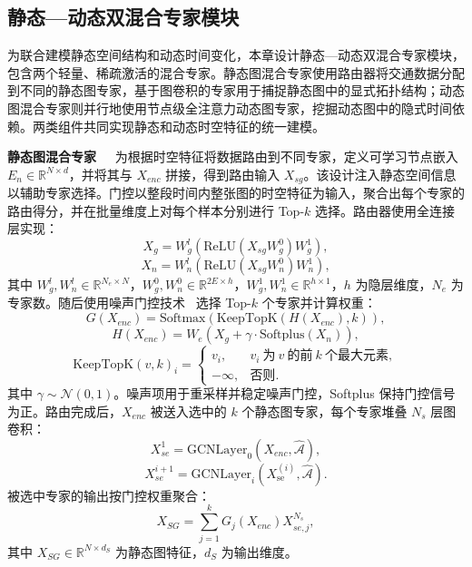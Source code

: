 \subsection{静态—动态双混合专家模块}
\label{sec:ch4_sdmoe}

为联合建模静态空间结构和动态时间变化，本章设计静态—动态双混合专家模块，包含两个轻量、稀疏激活的混合专家。静态图混合专家使用路由器将交通数据分配到不同的静态图专家，基于图卷积的专家用于捕捉静态图中的显式拓扑结构；动态图混合专家则并行地使用节点级全注意力动态图专家，挖掘动态图中的隐式时间依赖。两类组件共同实现静态和动态时空特征的统一建模。

\noindent\textbf{静态图混合专家\ \ } 为根据时空特征将数据路由到不同专家，定义可学习节点嵌入 $E_n\in\mathbb{R}^{N\times d}$，并将其与 $X_{enc}$ 拼接，得到路由输入 $X_{sg}$。该设计注入静态空间信息以辅助专家选择。门控以整段时间内整张图的时空特征为输入，聚合出每个专家的路由得分，并在批量维度上对每个样本分别进行 Top-$k$ 选择。路由器使用全连接层实现：
\begin{equation}
    X_g=W_g^l\left(\mathrm{ReLU}\!\left(X_{sg}W_g^0\right)W_g^1\right),
\end{equation}
\begin{equation}
    X_n=W_n^l\left(\mathrm{ReLU}\!\left(X_{sg}W_n^0\right)W_n^1\right),
\end{equation}
其中 $W_g^l,W_n^l\in\mathbb{R}^{N_e\times N}$，$W_g^0,W_n^0\in\mathbb{R}^{2E\times h}$，$W_g^1,W_n^1\in\mathbb{R}^{h\times 1}$，$h$ 为隐层维度，$N_e$ 为专家数。随后使用噪声门控技术~\cite{moe} 选择 Top-$k$ 个专家并计算权重：
\begin{equation}
G\!\left(X_{enc}\right)=\mathrm{Softmax}\!\left(\mathrm{KeepTopK}\!\left(H\!\left(X_{enc}\right),k\right)\right),
\end{equation}
\begin{equation}
H\!\left(X_{enc}\right)=W_e\left(X_g+\gamma\cdot\mathrm{Softplus}\!\left(X_n\right)\right),
\end{equation}
\begin{equation}
\mathrm{KeepTopK}(v,k)_i=
\left\{
\begin{array}{ll}
v_i, & v_i \ \mbox{为}\ v \ \mbox{的前}\ k\ \mbox{个最大元素},\\
-\infty, & \mbox{否则}.
\end{array}
\right.
\end{equation}
其中 $\gamma\sim\mathcal{N}(0,1)$。噪声项用于重采样并稳定噪声门控，Softplus 保持门控信号为正。路由完成后，$X_{enc}$ 被送入选中的 $k$ 个静态图专家，每个专家堆叠 $N_s$ 层图卷积：
\begin{equation}
    X_{se}^1=\mathrm{GCNLayer}_0\!\left(X_{enc},\hat{\mathcal{A}}\right),
\end{equation}
\begin{equation}
    X_{se}^{i+1}=\mathrm{GCNLayer}_i\!\left(X_{\mathrm{se}}^{(i)},\hat{\mathcal{A}}\right).
\end{equation}
被选中专家的输出按门控权重聚合：
\begin{equation}
X_{SG}=\sum_{j=1}^{k}G_j\!\left(X_{enc}\right)X_{se,j}^{N_s},
\end{equation}
其中 $X_{SG}\in\mathbb{R}^{N\times d_S}$ 为静态图特征，$d_S$ 为输出维度。

